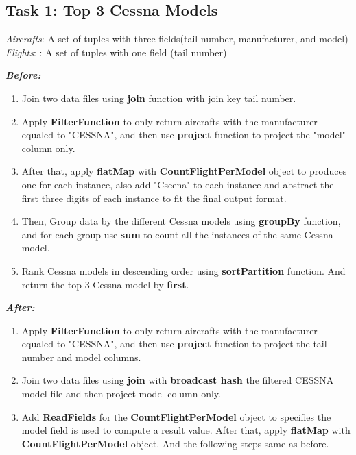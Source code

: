 \documentclass[12pt]{article}
\begin{document}
\subsection*{Task 1: Top 3 Cessna Models}
\textit{Aircrafts}: A set of tuples with three fields(tail number, manufacturer, and model)\\
\textit{Flights}: : A set of tuples with one field (tail number)

\textbf{\textit{Before:}} 
\begin{enumerate}
  \item Join two data files using \textbf{join} function with join key tail number. 
  
  \item Apply \textbf{FilterFunction} to only return aircrafts with the manufacturer equaled to "CESSNA", and then use \textbf{project} function to project the "model" column only. 
  
  \item After that, apply \textbf{flatMap} with \textbf{CountFlightPerModel} object to produces one for each instance, also add "Cseena" to each instance and abstract the first three digits of each instance to fit the final output format.
  
  \item Then, Group data by the different Cessna models using \textbf{groupBy} function, and for each group use \textbf{sum} to count all the instances of the same Cessna model.
  
  \item Rank Cessna models in descending order using \textbf{sortPartition} function. And return the top 3 Cessna model by \textbf{first}.
\end{enumerate}


\textbf{\textit{After:}}
\begin{enumerate}

 \item Apply \textbf{FilterFunction} to only return aircrafts with the manufacturer equaled to "CESSNA", and then use \textbf{project} function to project the tail number and model columns. 
 
 \item Join two data files using \textbf{join} with \textbf{broadcast hash} the filtered CESSNA model file and then project model column only.  
  
 \item Add \textbf{ReadFields} for the \textbf{CountFlightPerModel} object to specifies the model field is used to compute a result value. After that, apply \textbf{flatMap} with \textbf{CountFlightPerModel} object. And the following steps same as before.
\end{enumerate}
\end{document}
